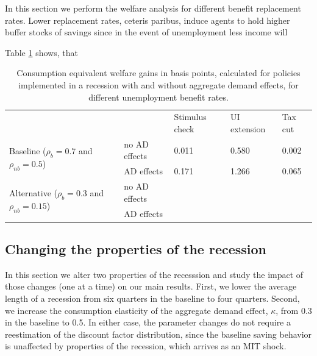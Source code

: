 \documentclass[../HAFiscal]{subfiles}
\begin{document}
In this section we perform the welfare analysis for different benefit replacement rates. Lower replacement rates, ceteris paribus, induce agents to hold higher buffer stocks of savings since in the event of unemployment less income will 

Table \ref{tab:robustness_benefit_results} shows, that 



\begin{table}[]
	\begin{center}
		\begin{tabular}{@{}lllll@{}}
			\toprule
			&                    & Stimulus check & UI extension & Tax cut \\ \cmidrule(l){1-5} 
			\multirow{2}{*}{Baseline  ($\rho_{b}=0.7$ and $\rho_{nb}=0.5$)} 	& no AD effects & 0.011          & 0.580        & 0.002   \\
			& AD effects    & 0.171          & 1.266        & 0.065   \\
			\multirow{2}{*}{Alternative  ($\rho_{b}=0.3$ and $\rho_{nb}=0.15$)} & no AD effects &           &        &    \\
			& AD effects    &           &         &    \\ \cmidrule(l){1-5} 
		\end{tabular}
		\caption{Consumption equivalent welfare gains in basis points, calculated for policies implemented in a recession with and without aggregate demand effects, for different unemployment benefit rates.}
		\label{tab:robustness_benefit_results}
	\end{center}
\end{table}




\FloatBarrier
\subsection{Changing the properties of the recession}

In this section we alter two properties of the recesssion and study the impact of those changes (one at a time) on our main results. First, we lower the average length of a recession from six quarters in the baseline to four quarters. Second, we increase the consumption elasticity of the aggregate demand effect, $\kappa$, from 0.3 in the baseline to 0.5. In either case, the parameter changes do not require a reestimation of the discount factor distribution, since the baseline saving behavior is unaffected by properties of the recession, which arrives as an MIT shock. 
\end{document}

